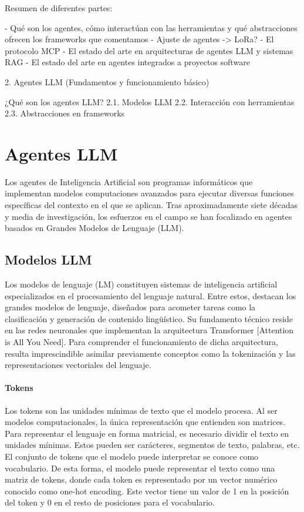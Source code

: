 Resumen de diferentes partes: 

- Qué son los agentes, cómo interactúan con las herramientas y qué abstracciones ofrecen los frameworks que comentamos
- Ajuste de agentes -> LoRa?
- El protocolo MCP
- El estado del arte en arquitecturas de agentes LLM y sistemas RAG
- El estado del arte en agentes integrados a proyectos software

2. Agentes LLM (Fundamentos y funcionamiento básico)

¿Qué son los agentes LLM?
2.1. Modelos LLM
2.2. Interacción con herramientas
2.3. Abstracciones en frameworks

\section{Agentes LLM}

Los agentes de Inteligencia Artificial son programas informáticos que implementan modelos computaciones avanzados para ejecutar diversas funciones específicas del contexto en el que se aplican. Tras aproximadamente siete décadas y media de investigación, los esfuerzos en el campo se han focalizado en agentes basados en Grandes Modelos de Lenguaje (LLM). 

\subsection{Modelos LLM}

Los modelos de lenguaje (LM) constituyen sistemas de inteligencia artificial especializados en el procesamiento del lenguaje natural. Entre estos, destacan los grandes modelos de lenguaje, diseñados para acometer tareas  como la clasificación y generación de contenido lingüístico. Su fundamento técnico reside en las redes neuronales que implementan la arquitectura Transformer [Attention is All You Need]. Para comprender el funcionamiento de dicha arquitectura, resulta imprescindible asimilar previamente conceptos como la tokenización y las representaciones vectoriales del lenguaje.

\paragraph{Tokens}
Los tokens son las unidades mínimas de texto que el modelo procesa. Al ser modelos computacionales, la única representación que entienden son matrices. Para representar el lenguaje en forma matricial, es necesario dividir el texto en unidades mínimas. Estos pueden ser carácteres, segmentos de texto, palabras, etc. El conjunto de tokens que el modelo puede interpretar se conoce como vocabulario. De esta forma, el modelo puede representar el texto como una matriz de tokens, donde cada token es representado por un vector numérico conocido como one-hot encoding. Este vector tiene un valor de 1 en la posición del token y 0 en el resto de posiciones para el vocabulario.

